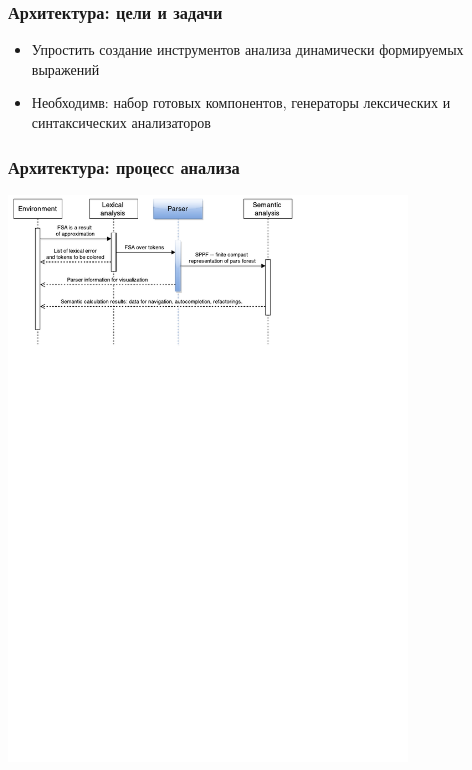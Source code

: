 \documentclass{beamer}
\begin{document}
\begin{frame}
    \transwipe[direction=90]
    \frametitle{Архитектура: цели и задачи}
    \begin{itemize}
        \item Упростить создание инструментов анализа динамически формируемых выражений
        \item Необходимв: набор готовых компонентов, генераторы лексических и синтаксических анализаторов
    \end{itemize}
\end{frame}

\begin{frame}
    \transwipe[direction=90]
    \frametitle{Архитектура: процесс анализа}
    \begin{center}
        \includegraphics[width=300pt]{pictures/Seq.pdf}
    \end{center}
\end{frame}
\end{document}
